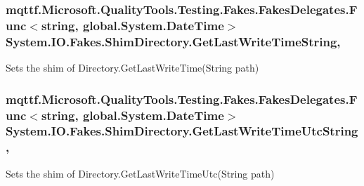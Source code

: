 \hypertarget{class_system_1_1_i_o_1_1_fakes_1_1_shim_directory_aa00c7abc99fb57c9204982e51176866c}{
\subsubsection[{Get\-Last\-Write\-Time\-String}]{\setlength{\rightskip}{0pt plus 5cm}mqttf.\-Microsoft.\-Quality\-Tools.\-Testing.\-Fakes.\-Fakes\-Delegates.\-Func$<$string, global.\-System.\-Date\-Time$>$ System.\-I\-O.\-Fakes.\-Shim\-Directory.\-Get\-Last\-Write\-Time\-String\hspace{0.3cm}{\ttfamily [static]}, {\ttfamily [set]}}}\label{class_system_1_1_i_o_1_1_fakes_1_1_shim_directory_aa00c7abc99fb57c9204982e51176866c}


Sets the shim of Directory.\-Get\-Last\-Write\-Time(\-String path)

\hypertarget{class_system_1_1_i_o_1_1_fakes_1_1_shim_directory_aeb3fb87a2995e3d2629d7984f8282e66}{
\subsubsection[{Get\-Last\-Write\-Time\-Utc\-String}]{\setlength{\rightskip}{0pt plus 5cm}mqttf.\-Microsoft.\-Quality\-Tools.\-Testing.\-Fakes.\-Fakes\-Delegates.\-Func$<$string, global.\-System.\-Date\-Time$>$ System.\-I\-O.\-Fakes.\-Shim\-Directory.\-Get\-Last\-Write\-Time\-Utc\-String\hspace{0.3cm}{\ttfamily [static]}, {\ttfamily [set]}}}\label{class_system_1_1_i_o_1_1_fakes_1_1_shim_directory_aeb3fb87a2995e3d2629d7984f8282e66}


Sets the shim of Directory.\-Get\-Last\-Write\-Time\-Utc(\-String path)

